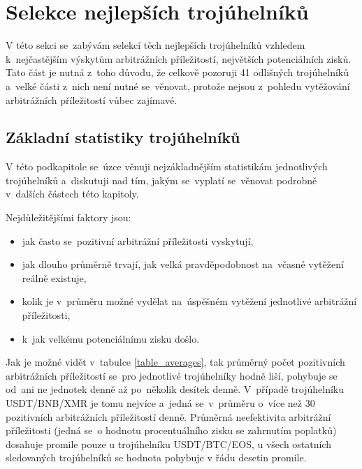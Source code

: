 \documentclass[thesis=B,czech]{FITthesis}[2019/03/21]
\begin{document}
\section{Selekce nejlepších trojúhelníků}
V této sekci se~zabývám selekcí těch nejlepších trojúhelníků vzhledem \linebreak k~nejčastějším výskytům arbitrážních příležitostí, největších potenciálních \linebreak zisků. Tato část je nutná z~toho důvodu, že celkově pozoruji 41 odlišných trojúhelníků a~velké části z~nich není nutné se~věnovat, protože nejsou z~pohledu vytěžování arbitrážních příležitostí vůbec zajímavé.

\subsection{Základní statistiky trojúhelníků}
V této podkapitole se~úzce věnuji nejzákladnějším statistikám jednotlivých trojúhelníků a~diskutuji nad tím, jakým se~vyplatí se~věnovat podrobně \linebreak v~dalších částech této kapitoly.

Nejdůležitějšími faktory jsou: 
\begin{itemize}
    \item jak často se~pozitivní arbitrážní příležitosti vyskytují,
    \item jak dlouho průměrně trvají, jak velká pravděpodobnost na~včasné \linebreak vytěžení reálně existuje,
    \item kolik je v~průměru možné vydělat na~úspěšném vytěžení jednotlivé arbitrážní příležitosti,
    \item k~jak velkému potenciálnímu zisku došlo.
\end{itemize}
Jak je možné vidět v~tabulce \ref{table_averages}, tak průměrný počet pozitivních arbitrážních příležitostí se~pro jednotlivé trojúhelníky hodně liší, pohybuje se od~ani ne jednotek denně až po~několik desítek denně. V~případě trojúhelníku  \linebreak USDT/BNB/XMR je tomu nejvíce a~jedná se~v~průměru o~více než 30 pozitivních arbitrážních příležitostí denně. Průměrná neefektivita arbitrážní příležitosti (jedná se~o hodnotu procentuálního zisku se zahrnutím poplatků) dosahuje promile pouze u trojúhelníku USDT/BTC/EOS, u všech ostatních sledovaných trojúhelníků se hodnota pohybuje v řádu desetin promile.
\end{document}
